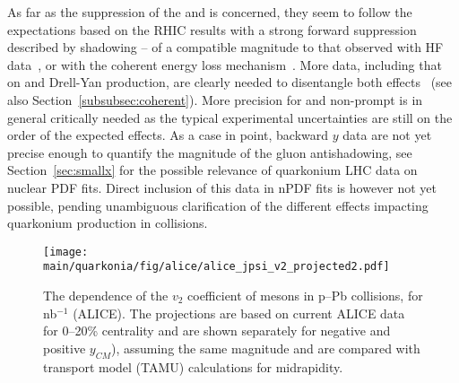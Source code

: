 \documentclass[../report.tex]{subfiles}
\providecommand{\main}{..}
\begin{document}
As far as the suppression of the  and \PJgy is concerned, they seem to follow the expectations based on the RHIC results with a strong forward suppression described by shadowing -- of a compatible magnitude to that observed with HF data~\cite{Kusina:2017gkz}, or with the coherent energy loss mechanism~\cite{Arleo:2010rb}. More data, including that on  and Drell-Yan production, are clearly needed to disentangle both effects~\cite{Arleo:2015qiv} (see also Section~\ref{subsubsec:coherent}). More precision for  and non-prompt \PJgy is in general critically needed as the typical experimental uncertainties are still on the order of the expected effects. As a case in point, backward $y$ data are not yet precise enough to quantify the magnitude of the gluon antishadowing, see Section~\ref{sec:smallx} for the possible relevance of quarkonium \pPb LHC data on nuclear PDF fits. Direct inclusion of this data in nPDF fits is however not yet possible, pending unambiguous clarification of the different effects impacting quarkonium production in \pPb collisions.

\begin{figure}[h]
 \begin{center}
  \texttt{[image: \\main/quarkonia/fig/alice/alice\_jpsi\_v2\_projected2.pdf]}
 \end{center}
 \caption{The \pT dependence of the $v_2$ coefficient of \PJgy mesons in p--Pb collisions, for \unit[500]{nb}$^{-1}$ (ALICE). The projections are based on current ALICE data for 0--20\% centrality \cite{Acharya:2017tfn}  and are shown separately for negative and positive $y_{CM}$), assuming the same magnitude and are compared with transport model (TAMU) calculations \cite{Du:2018wsj} for midrapidity.}
\label{FigQ:v2pTpPb}
\end{figure}
\end{document}
